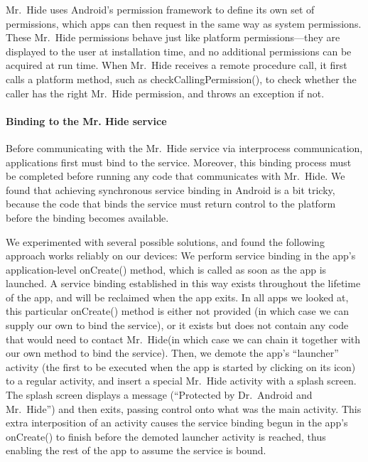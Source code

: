 \documentclass[preprint]{sig-alternate-10pt}
\newcommand{\code}[1]{\textsf{#1}}
\newcommand{\lib}{Mr.\ Hide\xspace}
\newcommand{\rewriter}{Dr.\ Android\xspace}
\newcommand{\comment}[3][\color{red}]{}%
\newcommand{\jsjeon}[1]{\comment[\color{red}]{JJ}{#1}}
\begin{document}
\lib uses Android's permission framework to define its own set of
permissions, which apps can then request in the same way as system
permissions. These \lib permissions behave just like platform
permissions---they are displayed to the user at installation time, and
no additional permissions can be acquired at run time.  When \lib
receives a remote procedure call, it first calls a platform method,
such as
\code{checkCallingPermission()}, to check whether the caller has
the right \lib permission, and throws an exception if not.  

\paragraph*{Binding to the Mr. Hide service}
Before communicating with the \lib service via interprocess
communication, applications first must bind to the service. Moreover,
this binding process must be completed before running any code that
communicates with \lib. We found that achieving synchronous service
binding in Android is a bit tricky, because the code that binds the
service must return control to the platform before the binding becomes
available.

We experimented with several possible solutions, and found the
following approach works reliably on our devices: We perform service
binding in the app's application-level \code{onCreate()} method, which
is called as soon as the app is launched.  A service binding
established in this way exists throughout the lifetime of the app, and
will be reclaimed when the app exits.
In all apps we looked at, this particular \code{onCreate()} method is
either not provided (in which case we can supply our own to bind the
service), or it exists but does not contain any code that would need
to contact \lib (in which case we can chain it together with our own
method to bind the service). Then, we demote the app's ``launcher''
activity (the first to be executed when the app is started by clicking
on its icon) to a regular activity, and insert a special \lib activity
with a splash screen. The splash screen displays a message
(``Protected by \rewriter and \lib'') and then exits, passing
control onto what was the main activity. This extra interposition of
an activity causes the service binding begun in the app's
\code{onCreate()} to finish before the demoted launcher activity is
reached, thus enabling the rest of the app to assume the service is
bound.
\end{document}
